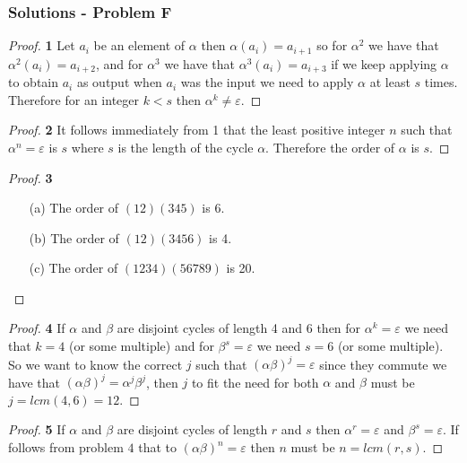 \documentclass[11pt]{article}
\begin{document}
		\subsubsection*{Solutions - Problem F}
		\begin{proof}{\textbf{1}}
			Let $a_i$ be an element of $\alpha$ then $\alpha(a_i) = a_{i+1}$
			so for $\alpha^{2}$ we have that $\alpha^{2}(a_i) = a_{i+2}$, and
			for $\alpha^{3}$ we have that $\alpha^{3}(a_i) = a_{i+3}$ if we
			keep applying $\alpha$ to obtain $a_i$ as output when $a_i$ was the
			input we need to apply $\alpha$ at least $s$ times. Therefore for 
			an integer $k < s$ then $\alpha^{k} \neq \varepsilon$.
		\end{proof}
		\begin{proof}{\textbf{2}}
			It follows immediately from 1 that the least positive integer $n$
			such that $\alpha^{n} = \varepsilon$ is $s$ where $s$ is the length
			of the cycle $\alpha$. Therefore the order of $\alpha$ is $s$.
		\end{proof}
		\begin{proof}{\textbf{3}}
			\begin{itemize}
				\item [(a)] The order of $(12)(345)$ is 6.
				\item [(b)] The order of $(12)(3456)$ is 4.
				\item [(c)] The order of $(1234)(56789)$ is 20.
			\end{itemize}
		\end{proof}
		\begin{proof}{\textbf{4}}
			If $\alpha$ and $\beta$ are disjoint cycles of length 4 and 6 then
			for $\alpha^k = \varepsilon$ we need that $k=4$ (or some multiple)
			and for $\beta^{s} = \varepsilon$ we need $s=6$ (or some multiple).
			So we want to know the correct $j$ such that
			$(\alpha\beta)^j=\varepsilon$ since they commute we have that
			$(\alpha\beta)^j=\alpha^j\beta^j$, then $j$ to fit the need for 
			both $\alpha$ and $\beta$ must be $j=lcm(4,6)=12	$.
		\end{proof}
		\begin{proof}{\textbf{5}}
			If $\alpha$ and $\beta$ are disjoint cycles of length $r$ and $s$
			then $\alpha^r = \varepsilon$ and $\beta^{s} = \varepsilon$. If
			follows from problem $4$ that to $(\alpha\beta)^n=\varepsilon$
			then $n$ must be $n=lcm(r,s)$.
		\end{proof}
\end{document}
